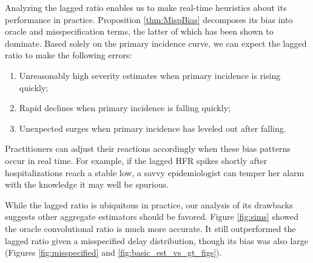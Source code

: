 \documentclass{article}
\begin{document}
Analyzing the lagged ratio enables us to make real-time heuristics about its performance in practice. Proposition \ref{thm:MispBias} decomposes its bias into oracle and misspecification terms, the latter of which has been shown to dominate. Based solely on the primary incidence curve, we can expect the lagged ratio to make the following errors:
\begin{enumerate}
    \item Unreasonably high severity estimates when primary incidence is rising quickly;
    \item Rapid declines when primary incidence is falling quickly;
    \item Unexpected surges when primary incidence has leveled out after falling. 
\end{enumerate}

Practitioners can adjust their reactions accordingly when these bias patterns occur in real time. For example, if the lagged HFR spikes shortly after hospitalizations reach a stable low, a savvy epidemiologist can temper her alarm with the knowledge it may well be spurious.

While the lagged ratio is ubiquitous in practice, our analysis of its
drawbacks suggests other aggregate estimators should be favored. Figure
\ref{fig:sims} showed the oracle convolutional ratio is much more
accurate. 
It still outperformed the lagged ratio given a misspecified delay distribution, though its bias was also large (Figures \ref{fig:misspecified} and \ref{fig:basic_est_vs_gt_figs}).


\end{document}
